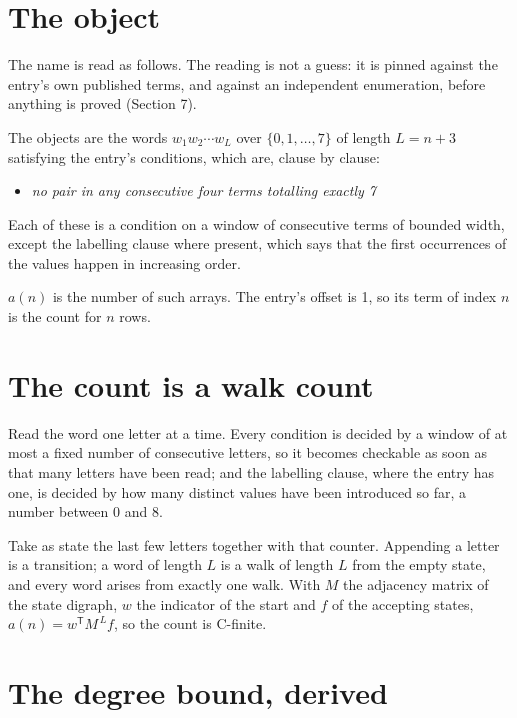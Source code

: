 \documentclass[11pt]{article}
\theoremstyle{definition}
\begin{document}
\section{The object}

The name is read as follows. The reading is not a guess: it is pinned against the entry's own published terms, and against an independent enumeration, before anything is proved (Section 7).

The objects are the words $w_1 w_2 \cdots w_L$ over $\{0,1,\dots,7\}$ of length $L = n + 3$ satisfying the entry's conditions, which are, clause by clause:

\begin{itemize}

\item {\itshape no pair in any consecutive four terms totalling exactly 7}

\end{itemize}

Each of these is a condition on a window of consecutive terms of bounded width, except the labelling clause where present, which says that the first occurrences of the values happen in increasing order.

$a(n)$ is the number of such arrays. The entry's offset is 1, so its term of index $n$ is the count for $n$ rows.

\section{The count is a walk count}

Read the word one letter at a time. Every condition is decided by a window of at most a fixed number of consecutive letters, so it becomes checkable as soon as that many letters have been read; and the labelling clause, where the entry has one, is decided by how many distinct values have been introduced so far, a number between $0$ and 8.

Take as state the last few letters together with that counter. Appending a letter is a transition; a word of length $L$ is a walk of length $L$ from the empty state, and every word arises from exactly one walk. With $M$ the adjacency matrix of the state digraph, $w$ the indicator of the start and $f$ of the accepting states, $a(n) = w^{\mathsf T}M^{\,L}f$, so the count is C-finite.

\section{The degree bound, derived}
\end{document}
